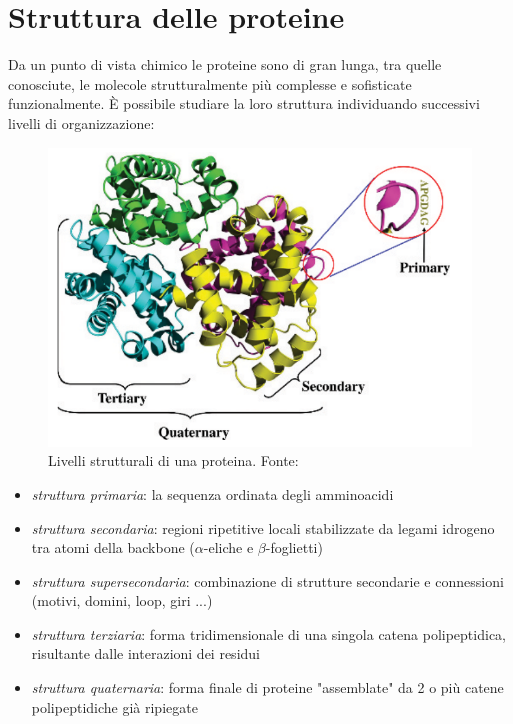 \section{Struttura delle proteine}
{
Da un punto di vista chimico le proteine sono di gran lunga, tra quelle conosciute, le molecole strutturalmente più complesse e sofisticate funzionalmente. È possibile studiare la loro struttura individuando successivi livelli di organizzazione:

\begin{figure}[!htp]
	\centering
	\includegraphics[scale=0.5]{images/strutture-proteina.png}
	\caption{Livelli strutturali di una proteina. Fonte: \cite{kessel_ben-tal_2018}}
	\label{fig:strutture-proteine}
\end{figure}

\begin{itemize}
	\item \textit{struttura primaria}: la sequenza ordinata degli amminoacidi
	\item \textit{struttura secondaria}: regioni ripetitive locali stabilizzate da legami idrogeno tra atomi della backbone ($\alpha$-eliche e $\beta$-foglietti)
	\item \textit{struttura supersecondaria}: combinazione di strutture secondarie e connessioni (motivi, domini, loop, giri ...)
	\item \textit{struttura terziaria}: forma tridimensionale di una singola catena polipeptidica, risultante dalle interazioni dei residui
	\item \textit{struttura quaternaria}: forma finale di proteine "assemblate" da 2 o più catene polipeptidiche già ripiegate
\end{itemize}

}
